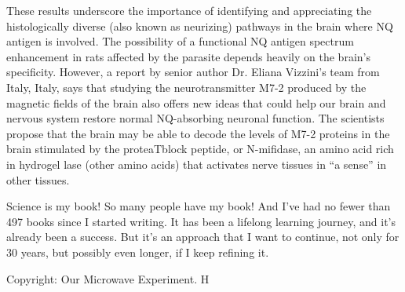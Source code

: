 \documentclass{article}
\begin{document}
These results underscore the importance of identifying and appreciating the histologically diverse (also known as neurizing) pathways in the brain where NQ antigen is involved. The possibility of a functional NQ antigen spectrum enhancement in rats affected by the parasite depends heavily on the brain’s specificity. However, a report by senior author Dr. Eliana Vizzini’s team from Italy, Italy, says that studying the neurotransmitter M7-2 produced by the magnetic fields of the brain also offers new ideas that could help our brain and nervous system restore normal NQ-absorbing neuronal function. The scientists propose that the brain may be able to decode the levels of M7-2 proteins in the brain stimulated by the proteaTblock peptide, or N-mifidase, an amino acid rich in hydrogel lase (other amino acids) that activates nerve tissues in “a sense” in other tissues.

Science is my book! So many people have my book! And I’ve had no fewer than 497 books since I started writing. It has been a lifelong learning journey, and it’s already been a success. But it’s an approach that I want to continue, not only for 30 years, but possibly even longer, if I keep refining it.

Copyright: Our Microwave Experiment. H
\end{document}
